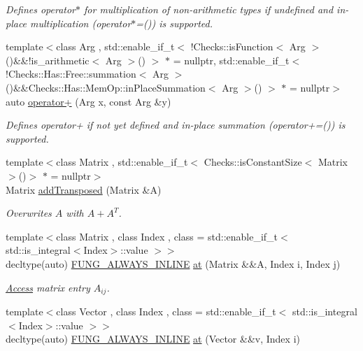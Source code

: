 \begin{DoxyCompactItemize}
\begin{DoxyCompactList}\small\item\em Defines operator$\ast$ for multiplication of non-\/arithmetic types if undefined and in-\/place multiplication (operator$\ast$=()) is supported. \end{DoxyCompactList}\item 
{\footnotesize template$<$class Arg , std\+::enable\+\_\+if\+\_\+t$<$ !\+Checks\+::is\+Function$<$ Arg $>$()\&\&!is\+\_\+arithmetic$<$ Arg $>$() $>$ $\ast$  = nullptr, std\+::enable\+\_\+if\+\_\+t$<$ !\+Checks\+::\+Has\+::\+Free\+::summation$<$ Arg $>$()\&\&\+Checks\+::\+Has\+::\+Mem\+Op\+::in\+Place\+Summation$<$ Arg $>$() $>$ $\ast$  = nullptr$>$ }\\auto \hyperlink{namespaceFunG_a063d3e8c19dbea3ee1396736fecb64e1}{operator+} (Arg x, const Arg \&y)
\begin{DoxyCompactList}\small\item\em Defines operator+ if not yet defined and in-\/place summation (operator+=()) is supported. \end{DoxyCompactList}\item 
{\footnotesize template$<$class Matrix , std\+::enable\+\_\+if\+\_\+t$<$ Checks\+::is\+Constant\+Size$<$ Matrix $>$()$>$ $\ast$  = nullptr$>$ }\\Matrix \hyperlink{namespaceFunG_a0211d0d26c669d56b5113fd2292902e5}{add\+Transposed} (Matrix \&A)
\begin{DoxyCompactList}\small\item\em Overwrites $A$ with $A+A^T$. \end{DoxyCompactList}\item 
{\footnotesize template$<$class Matrix , class Index , class  = std\+::enable\+\_\+if\+\_\+t$<$ std\+::is\+\_\+integral$<$\+Index$>$\+::value $>$$>$ }\\decltype(auto) \hyperlink{macros_8hh_a03b9da186125795e5afa49d0ef1cc32f}{F\+U\+N\+G\+\_\+\+A\+L\+W\+A\+Y\+S\+\_\+\+I\+N\+L\+I\+NE} \hyperlink{namespaceFunG_aae631e6149505bdfc0b1c6162b370c7f}{at} (Matrix \&\&A, Index i, Index j)
\begin{DoxyCompactList}\small\item\em \hyperlink{namespaceFunG_1_1Access}{Access} matrix entry $A_{ij}$. \end{DoxyCompactList}\item 
{\footnotesize template$<$class Vector , class Index , class  = std\+::enable\+\_\+if\+\_\+t$<$ std\+::is\+\_\+integral$<$\+Index$>$\+::value $>$$>$ }\\decltype(auto) \hyperlink{macros_8hh_a03b9da186125795e5afa49d0ef1cc32f}{F\+U\+N\+G\+\_\+\+A\+L\+W\+A\+Y\+S\+\_\+\+I\+N\+L\+I\+NE} \hyperlink{namespaceFunG_aa40271c9228c5ccee8a4973f27918630}{at} (Vector \&\&v, Index i)

\end{DoxyCompactItemize}
